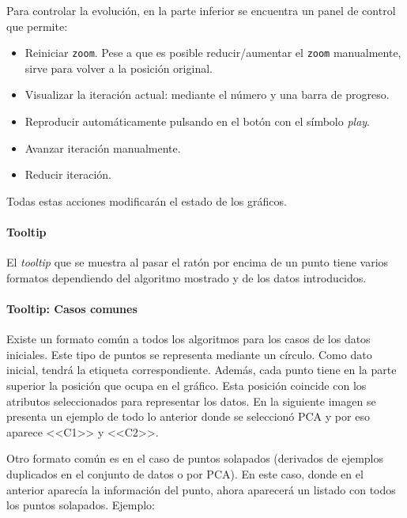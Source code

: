 Para controlar la evolución, en la parte inferior se encuentra un panel de
control que permite:
\begin{itemize}
    \item Reiniciar \texttt{zoom}. Pese a que es posible reducir/aumentar el
    \texttt{zoom} manualmente, sirve para volver a la posición original.
    \item Visualizar la iteración actual: mediante el número y una barra de
    progreso.
    \item Reproducir automáticamente pulsando en el botón con el símbolo
    \textit{play}.
    \item Avanzar iteración manualmente.
    \item Reducir iteración.
\end{itemize}

Todas estas acciones modificarán el estado de los gráficos.

\paragraph{Tooltip} El \textit{tooltip} que se muestra al pasar el ratón por
encima de un punto tiene varios formatos dependiendo del algoritmo mostrado y de
los datos introducidos.

\paragraph{Tooltip: Casos comunes}

Existe un formato común a todos los algoritmos para los casos de los datos
iniciales. Este tipo de puntos se representa mediante un círculo. Como dato
inicial, tendrá la etiqueta correspondiente. Además, cada punto tiene en la
parte superior la posición que ocupa en el gráfico. Esta posición coincide con
los atributos seleccionados para representar los datos. En la siguiente imagen
se presenta un ejemplo de todo lo anterior donde se seleccionó PCA y por eso
aparece <<C1>> y <<C2>>.


Otro formato común es en el caso de puntos solapados (derivados de ejemplos
duplicados en el conjunto de datos o por PCA). En este caso, donde en el anterior
aparecía la información del punto, ahora aparecerá un listado con todos los
puntos solapados. Ejemplo:


